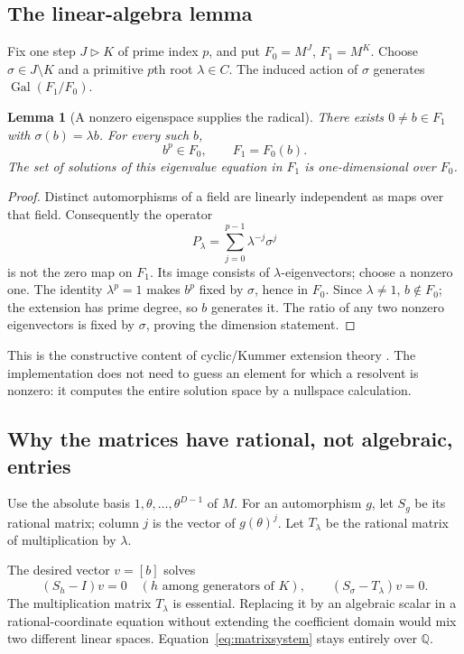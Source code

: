 \documentclass[11pt,letterpaper]{article}
\newtheorem{lemma}[theorem]{Lemma}
\theoremstyle{definition}\newtheorem{definition}[theorem]{Definition}
\theoremstyle{remark}\newtheorem{remark}[theorem]{Remark}
\newcommand{\Q}{\mathbb Q}\newcommand{\C}{\mathbb C}\newcommand{\Z}{\mathbb Z}
\newcommand{\Gal}{\operatorname{Gal}}\newcommand{\Aut}{\operatorname{Aut}}
\begin{document}
\subsection{The linear-algebra lemma}
Fix one step $J\triangleright K$ of prime index $p$, and put $F_0=M^J$, $F_1=M^K$. Choose $\sigma\in J\setminus K$ and a primitive $p$th root $\lambda\in C$. The induced action of $\sigma$ generates $\Gal(F_1/F_0)$.

\begin{lemma}[A nonzero eigenspace supplies the radical]\label{lem:eigen}
There exists $0\ne b\in F_1$ with $\sigma(b)=\lambda b$. For every such $b$,
\[
 b^p\in F_0,\qquad F_1=F_0(b).
\]
The set of solutions of this eigenvalue equation in $F_1$ is one-dimensional over $F_0$.
\end{lemma}
\begin{proof}
Distinct automorphisms of a field are linearly independent as maps over that field. Consequently the operator
\[
 P_\lambda=\sum_{j=0}^{p-1}\lambda^{-j}\sigma^j
\]
is not the zero map on $F_1$. Its image consists of $\lambda$-eigenvectors; choose a nonzero one. The identity $\lambda^p=1$ makes $b^p$ fixed by $\sigma$, hence in $F_0$. Since $\lambda\ne1$, $b\notin F_0$; the extension has prime degree, so $b$ generates it. The ratio of any two nonzero eigenvectors is fixed by $\sigma$, proving the dimension statement.
\end{proof}
This is the constructive content of cyclic/Kummer extension theory \cite{milne}. The implementation does not need to guess an element for which a resolvent is nonzero: it computes the entire solution space by a nullspace calculation.

\subsection{Why the matrices have rational, not algebraic, entries}
Use the absolute basis $1,\theta,\ldots,\theta^{D-1}$ of $M$. For an automorphism $g$, let $S_g$ be its rational matrix; column $j$ is the vector of $g(\theta)^j$. Let $T_\lambda$ be the rational matrix of multiplication by $\lambda$.

The desired vector $v=[b]$ solves
\begin{equation}\label{eq:matrixsystem}
 (S_h-I)v=0\quad(h\text{ among generators of }K),\qquad
 (S_\sigma-T_\lambda)v=0.
\end{equation}
The multiplication matrix $T_\lambda$ is essential. Replacing it by an algebraic scalar in a rational-coordinate equation without extending the coefficient domain would mix two different linear spaces. Equation~\eqref{eq:matrixsystem} stays entirely over $\Q$.
\end{document}
